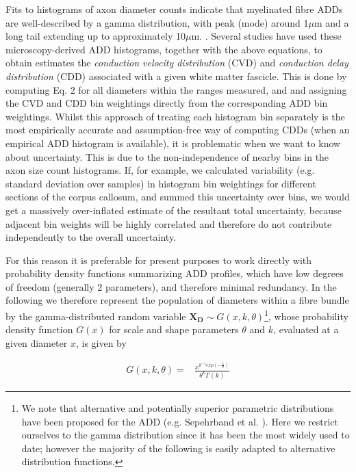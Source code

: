 Fits to histograms of axon diameter counts indicate that myelinated fibre ADDs are well-described by a gamma distribution, with peak (mode) around 1$\mu$m and a long tail extending up to approximately 10$\mu$m. \cite{aboitiz1992fiber}. Several studies have used these microscopy-derived ADD histograms, together with the above equations, to obtain estimates the \textit{conduction velocity distribution} (CVD) and \textit{conduction delay distribution} (CDD) associated with a given white matter fascicle. This is done by computing Eq. 2 for all diameters within the ranges measured, and and assigning the CVD and CDD bin weightings directly from the corresponding ADD bin weightings. Whilst this approach of treating each histogram bin separately is the most empirically accurate and assumption-free way of computing CDDs (when an empirical ADD histogram is available), it is problematic when we want to know about uncertainty. This is due to the non-independence of nearby bins in the axon size count histograms. If, for example, we calculated variability (e.g. standard deviation over samples) in histogram bin weightings for different sections of the corpus callosum, and summed this uncertainty over bins, we would get a massively over-inflated estimate of the resultant total uncertainty, because adjacent bin weights will be highly correlated and therefore do not contribute independently to the overall uncertainty. 

For this reason it is preferable for present purposes to work directly with probability density functions summarizing ADD profiles, which have low degrees of freedom (generally 2 parameters), and therefore minimal redundancy. In the following we therefore represent the population of diameters within a fibre bundle by the gamma-distributed random variable $\mathbf{X_D} \sim G(x,k,\theta)$\footnote{We note that alternative and potentially superior parametric distributions have been proposed for the ADD (e.g. Sepehrband et al. \cite{sepehrband2016parametric}). Here we restrict ourselves to the gamma distribution since it has been the most widely used to date; however the majority of the following is easily adapted to alternative distribution functions. 
}, whose probability density function $G(x)$ for scale and shape parameters $\theta$ and $k$, evaluated at a given diameter $x$, is given by 


\begin{eqnarray}
G(x,k,\theta) =& \frac{\displaystyle x^{k^{-1} exp(- \frac{\displaystyle x}{ \displaystyle \theta})}}{\displaystyle \theta^{k} \Gamma(k)} 
\end{eqnarray}

